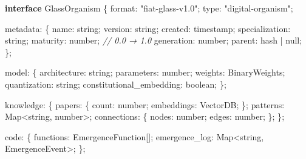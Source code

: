\documentclass[
]{article}
\newenvironment{Shaded}{}{}
\newcommand{\BuiltInTok}[1]{\textcolor[rgb]{0.00,0.50,0.00}{#1}}
\newcommand{\CommentTok}[1]{\textcolor[rgb]{0.38,0.63,0.69}{\textit{#1}}}
\newcommand{\DataTypeTok}[1]{\textcolor[rgb]{0.56,0.13,0.00}{#1}}
\newcommand{\KeywordTok}[1]{\textcolor[rgb]{0.00,0.44,0.13}{\textbf{#1}}}
\newcommand{\NormalTok}[1]{#1}
\newcommand{\OperatorTok}[1]{\textcolor[rgb]{0.40,0.40,0.40}{#1}}
\newcommand{\StringTok}[1]{\textcolor[rgb]{0.25,0.44,0.63}{#1}}
\begin{document}
\begin{Shaded}
\begin{Highlighting}[]
\KeywordTok{interface}\NormalTok{ GlassOrganism \{}
\NormalTok{  format}\OperatorTok{:} \StringTok{"fiat{-}glass{-}v1.0"}\OperatorTok{;}
\NormalTok{  type}\OperatorTok{:} \StringTok{"digital{-}organism"}\OperatorTok{;}

\NormalTok{  metadata}\OperatorTok{:}\NormalTok{ \{}
\NormalTok{    name}\OperatorTok{:} \DataTypeTok{string}\OperatorTok{;}
\NormalTok{    version}\OperatorTok{:} \DataTypeTok{string}\OperatorTok{;}
\NormalTok{    created}\OperatorTok{:}\NormalTok{ timestamp}\OperatorTok{;}
\NormalTok{    specialization}\OperatorTok{:} \DataTypeTok{string}\OperatorTok{;}
\NormalTok{    maturity}\OperatorTok{:} \DataTypeTok{number}\OperatorTok{;}  \CommentTok{// 0.0 → 1.0}
\NormalTok{    generation}\OperatorTok{:} \DataTypeTok{number}\OperatorTok{;}
\NormalTok{    parent}\OperatorTok{:}\NormalTok{ hash }\OperatorTok{|} \DataTypeTok{null}\OperatorTok{;}
\NormalTok{  \}}\OperatorTok{;}

\NormalTok{  model}\OperatorTok{:}\NormalTok{ \{}
\NormalTok{    architecture}\OperatorTok{:} \DataTypeTok{string}\OperatorTok{;}
\NormalTok{    parameters}\OperatorTok{:} \DataTypeTok{number}\OperatorTok{;}
\NormalTok{    weights}\OperatorTok{:}\NormalTok{ BinaryWeights}\OperatorTok{;}
\NormalTok{    quantization}\OperatorTok{:} \DataTypeTok{string}\OperatorTok{;}
\NormalTok{    constitutional\_embedding}\OperatorTok{:} \DataTypeTok{boolean}\OperatorTok{;}
\NormalTok{  \}}\OperatorTok{;}

\NormalTok{  knowledge}\OperatorTok{:}\NormalTok{ \{}
\NormalTok{    papers}\OperatorTok{:}\NormalTok{ \{ count}\OperatorTok{:} \DataTypeTok{number}\OperatorTok{;}\NormalTok{ embeddings}\OperatorTok{:}\NormalTok{ VectorDB}\OperatorTok{;}\NormalTok{ \}}\OperatorTok{;}
\NormalTok{    patterns}\OperatorTok{:} \BuiltInTok{Map}\OperatorTok{\textless{}}\DataTypeTok{string}\OperatorTok{,} \DataTypeTok{number}\OperatorTok{\textgreater{};}
\NormalTok{    connections}\OperatorTok{:}\NormalTok{ \{ nodes}\OperatorTok{:} \DataTypeTok{number}\OperatorTok{;}\NormalTok{ edges}\OperatorTok{:} \DataTypeTok{number}\OperatorTok{;}\NormalTok{ \}}\OperatorTok{;}
\NormalTok{  \}}\OperatorTok{;}

\NormalTok{  code}\OperatorTok{:}\NormalTok{ \{}
\NormalTok{    functions}\OperatorTok{:}\NormalTok{ EmergenceFunction[]}\OperatorTok{;}
\NormalTok{    emergence\_log}\OperatorTok{:} \BuiltInTok{Map}\OperatorTok{\textless{}}\DataTypeTok{string}\OperatorTok{,}\NormalTok{ EmergenceEvent}\OperatorTok{\textgreater{};}
\NormalTok{  \}}\OperatorTok{;}


\end{Highlighting}
\end{Shaded}
\end{document}
